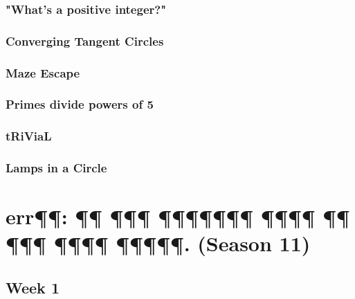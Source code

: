 \documentclass[titlepage=true]{scrartcl}
\begin{document}
        \subsubsection{"What's a positive integer?"}
        \label{10-2-2}  
        
        \newpage
			
        \subsubsection{Converging Tangent Circles}
        \label{10-2-3}  
        
        \newpage

        \subsubsection{Maze Escape}
        \label{10-2-4}
        
        \newpage 

        \subsubsection{Primes divide powers of 5}
        \label{10-2-5}  
        
        \newpage

        \subsubsection{tRiViaL}
        \label{10-2-6}  
        
        \newpage

        \subsubsection{Lamps in a Circle}
        \label{10-2-7}  
        
        \newpage

\section{err¶¶: ¶¶ ¶¶¶ ¶¶¶¶¶¶¶ ¶¶¶¶ ¶¶ ¶¶¶ ¶¶¶¶ ¶¶¶¶¶. (Season 11)}

    \subsection{Week 1}
\end{document}
